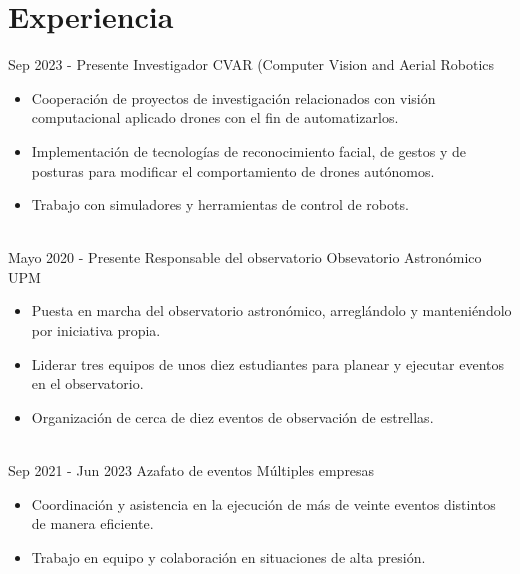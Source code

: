 \documentclass[letterpaper]{cv} %
\begin{document}
\makeprofile %
 

\color{black!70}
\section{Experiencia}

\begin{twenty} %
\twentyitem
    	{Sep 2023 -}
		{Presente}
        {Investigador}
        {CVAR (Computer Vision and Aerial Robotics}
        {}
        {\begin{itemize}
        \item Cooperación de proyectos de investigación relacionados con visión computacional aplicado drones con el fin de automatizarlos.
        \item Implementación de tecnologías de reconocimiento facial, de gestos y de posturas para modificar el comportamiento de drones autónomos.
        \item Trabajo con simuladores y herramientas de control de robots.
        \end{itemize}}
        \\
	\twentyitem
    	{Mayo 2020 -}
		{Presente}
        {Responsable del observatorio}
        {Obsevatorio Astronómico UPM}
        {}
        {
        {\begin{itemize}
        \item Puesta en marcha del observatorio astronómico, arreglándolo y manteniéndolo por iniciativa propia.
        \item Liderar tres equipos de unos diez estudiantes para planear y ejecutar eventos en el observatorio.
        \item Organización de cerca de diez eventos de observación de estrellas.
    \end{itemize}}
        }
    \\   
    \twentyitem
   		{Sep 2021 -}
		{Jun 2023}
        {Azafato de eventos}
        {Múltiples empresas}
        {}
        {
        {\begin{itemize}
        \item Coordinación y asistencia en la ejecución de más de veinte eventos distintos de manera eficiente.
        \item Trabajo en equipo y colaboración en situaciones de alta presión.
    \end{itemize}}
        }
        
\end{twenty}
\end{document}

